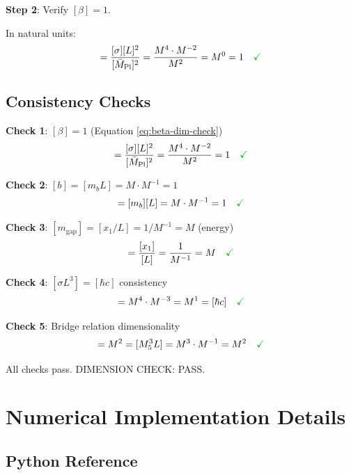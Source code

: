 \documentclass[11pt,a4paper]{article}
\newcommand{\Mpl}{\bar{M}_{\mathrm{Pl}}}
\newcommand{\Mfive}{M_5}
\newcommand{\mgap}{m_{\mathrm{gap}}}
\newcommand{\mb}{m_b}
\newcommand{\emark}{\textcolor{green!70!black}{\checkmark}}
\theoremstyle{definition}
\theoremstyle{plain}
\theoremstyle{remark}
\begin{document}
\textbf{Step 2}: Verify $[\beta] = 1$.

In natural units:
\begin{equation}
[\beta] = \frac{[\sigma][L]^2}{[\Mpl]^2} = \frac{M^4 \cdot M^{-2}}{M^2} = M^0 = 1 \quad \emark
\label{eq:beta-dim-natural}
\end{equation}

\subsection{Consistency Checks}

\textbf{Check 1}: $[\beta] = 1$ \emark (Equation \ref{eq:beta-dim-check})
\begin{equation}
[\beta] = \frac{[\sigma][L]^2}{[\Mpl]^2} = \frac{M^4 \cdot M^{-2}}{M^2} = 1 \quad \emark
\label{eq:dim-check-beta}
\end{equation}

\textbf{Check 2}: $[b] = [\mb L] = M \cdot M^{-1} = 1$ \emark
\begin{equation}
[b] = [\mb][L] = M \cdot M^{-1} = 1 \quad \emark
\label{eq:dim-check-b}
\end{equation}

\textbf{Check 3}: $[\mgap] = [x_1/L] = 1/M^{-1} = M$ (energy) \emark
\begin{equation}
[\mgap] = \frac{[x_1]}{[L]} = \frac{1}{M^{-1}} = M \quad \emark
\label{eq:dim-check-mgap}
\end{equation}

\textbf{Check 4}: $[\sigma L^3] = [\hbar c]$ consistency
\begin{equation}
[\sigma L^3] = M^4 \cdot M^{-3} = M^1 = [\hbar c] \quad \emark
\label{eq:dim-check-anchor}
\end{equation}

\textbf{Check 5}: Bridge relation dimensionality
\begin{equation}
[\Mpl^2] = M^2 = [\Mfive^3 L] = M^3 \cdot M^{-1} = M^2 \quad \emark
\label{eq:dim-check-bridge}
\end{equation}

All checks pass. DIMENSION CHECK: PASS.

\section{Numerical Implementation Details}
\label{sec:numerical-appendix}

\subsection{Python Reference}
\end{document}
